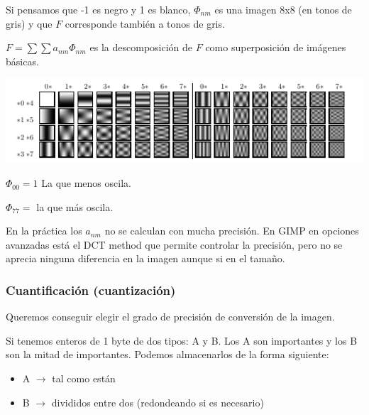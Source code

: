 			\begin{framed}
				\vspace{-1.5em}
				\begin{example}

					Si pensamos que -1 es negro y 1 es blanco, $\Phi_{nm}$ es una imagen 8x8 (en tonos de gris) y que $F$ corresponde también a tonos de gris.

					$F = \sum \sum a_{nm} \Phi_{nm}$ es la descomposición de $F$ como superposición de imágenes básicas.

					\begin{center}
						\includegraphics[width=\linewidth]{img/imagen_chamizo_grises.png}
					\end{center}

					$\Phi_{00} = 1 $ La que menos oscila.

					$\Phi_{77} = $ la que más oscila.


					\begin{obs} En la práctica los $a_{nm}$ no se calculan con mucha precisión. En GIMP en opciones avanzadas está el DCT method que permite controlar la precisión, pero no se aprecia ninguna diferencia en la imagen aunque si en el tamaño.
					\end{obs}

				\end{example}
			\end{framed}


		\subsubsection{Cuantificación (cuantización)}

			Queremos conseguir elegir el grado de precisión de conversión de la imagen.

			Si tenemos enteros de 1 byte de dos tipos: A y B. Los A son importantes y los B son la mitad de importantes. Podemos almacenarlos de la forma siguiente:
			\begin{itemize}
				\item A $\rightarrow$ tal como están
				\item B $\rightarrow$ divididos entre dos (redondeando si es necesario)
			\end{itemize}


